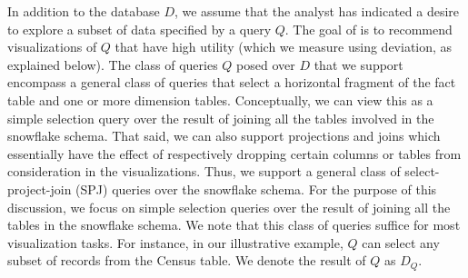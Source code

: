 In addition to the database $D$, we assume that the analyst has indicated
a desire to explore a subset of data specified by a query $Q$.
The goal of \SeeDB is to recommend visualizations of $Q$ that have
high utility (which we measure using deviation, as explained below).
The class of queries $Q$ posed over $D$ that we support encompass a general class of queries 
that select a horizontal fragment of the fact table and one or more dimension tables.
Conceptually, we can view this as a simple selection query over the result of joining all
the tables involved in the snowflake schema. 
That said, we can also support projections and joins which essentially have the effect
of respectively dropping certain columns or tables from consideration in the visualizations.
Thus, we support a general class of select-project-join (SPJ) queries over the snowflake schema.
For the purpose of this discussion, we focus on simple selection
queries over the result of joining all the tables in the snowflake schema.
We note that this class of queries 
suffice for most visualization tasks.
For instance, in our illustrative example, $Q$ can select any subset of records from the
Census table. 
We denote the result of $Q$ as $D_Q$.

